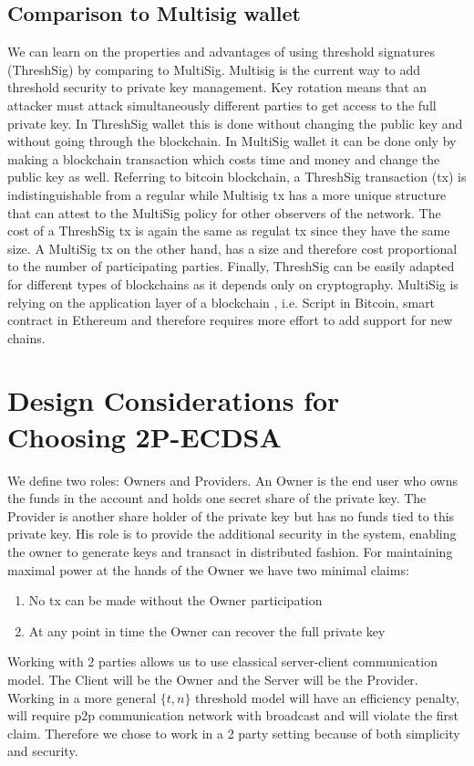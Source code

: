 \documentclass[runningheads]{llncs}
\begin{document}
\subsection{Comparison to Multisig wallet}
We can learn on the properties and advantages of using threshold signatures (ThreshSig) by comparing to MultiSig. Multisig is the current way to add threshold security to private key management. Key rotation means that an attacker must attack simultaneously different parties to get access to the full private key. In ThreshSig wallet this is done without changing the public key and without going through the blockchain. In MultiSig wallet it can be done only by making a blockchain transaction which costs time and money and change the public key as well. Referring to bitcoin blockchain, a ThreshSig transaction (tx) is indistinguishable from a regular while Multisig tx has a more unique structure that can attest to the MultiSig policy for other observers of the network. The cost of a ThreshSig tx is again the same as regulat tx since they have the same size. A MultiSig tx on the other hand, has a size and therefore cost proportional to the number of participating parties. Finally, ThreshSig can be easily adapted for different types of blockchains as it depends only on cryptography. MultiSig is relying on the application layer of a blockchain , i.e. Script in Bitcoin, smart contract in Ethereum and therefore requires more effort to add support for new chains.

\section{Design Considerations for Choosing 2P-ECDSA}
 We define two roles: Owners and Providers. An Owner is the end user who owns the funds in the account and holds one secret share of the private key. The Provider is another share holder of the private key but has no funds tied to this private key. His role is to provide the additional security in the system, enabling the owner to generate keys and transact in distributed fashion. For maintaining maximal power at the hands of the Owner we have two minimal claims:
\begin{enumerate}
    \item No tx can be made without the Owner participation
    \item At any point in time the Owner can recover the full private key
\end{enumerate}
Working with 2 parties allows us to use classical server-client communication model. The Client will be the Owner and the Server will be the Provider. Working in a more general $\{t,n\}$ threshold model will have an efficiency penalty, will require p2p communication network with broadcast and will violate the first claim. Therefore we chose to work in a 2 party setting because of both simplicity and security.
\end{document}
